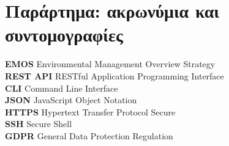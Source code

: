 \documentclass[a4paper,12pt, oneside]{article}
\begin{document}
\section{Παράρτημα: ακρωνύμια και συντομογραφίες}
\textlatin{\textbf{EMOS} Environmental Management Overview Strategy\\
\textbf{REST API}  RESTful Application Programming Interface\\
\textbf{CLI} Command Line Interface\\
\textbf{JSON} JavaScript Object Notation\\
\textbf{HTTPS} Hypertext Transfer Protocol Secure\\
\textbf{SSH} Secure Shell \\
\textbf{GDPR} General Data Protection Regulation
}
\end{document}
